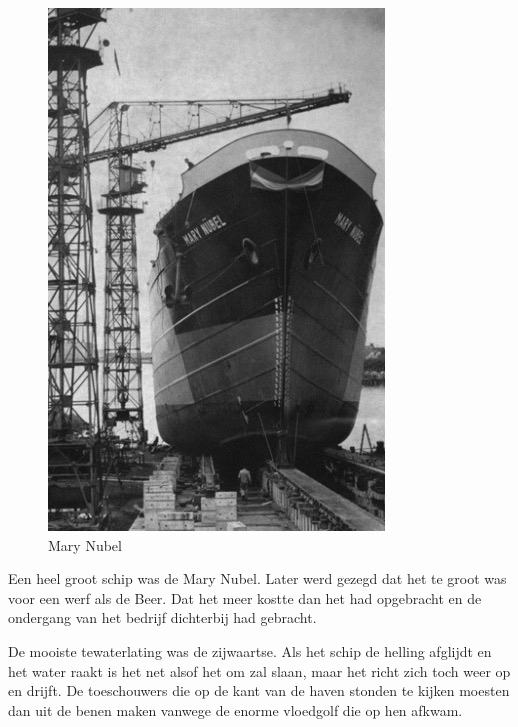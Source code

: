 \documentclass[12pt,twoside]{memoir}
\begin{document}
\begin{figure}
\includegraphics[width=\textwidth]{img/ch15/schuttevaer12}
\caption*{\footnotesize Mary Nubel}
\end{figure}

Een heel groot schip was de Mary Nubel. Later werd gezegd dat het te groot was voor een werf als de Beer. Dat het meer kostte dan het had opgebracht en de ondergang van het bedrijf dichterbij had gebracht. 

De mooiste tewaterlating was de zijwaartse. Als het schip de helling afglijdt en het water raakt is het net alsof het om zal slaan, maar het richt zich toch weer op en drijft. De toeschouwers die op de kant van de haven stonden te kijken moesten dan uit de benen maken vanwege de enorme vloedgolf die op hen afkwam.
\end{document}
